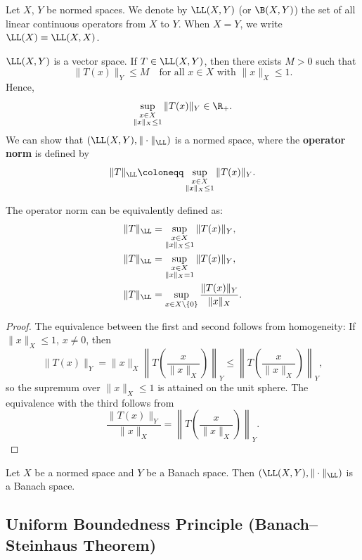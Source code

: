 \begin{definition}
Let $X$, $Y$ be normed spaces.  
We denote by $\LL(X,Y)$ (or $\B(X,Y)$) the set of all linear continuous operators from $X$ to $Y$.  
When $X = Y$, we write $\LL(X) \equiv \LL(X,X)$.
\end{definition}

\begin{remark}
$\LL(X,Y)$ is a vector space.  
If $T \in \LL(X,Y)$, then there exists $M > 0$ such that  
\[
\|T(x)\|_Y \leq M \quad \text{for all } x \in X \text{ with } \|x\|_X \leq 1.
\]
Hence,  
\[
\sup_{\substack{x \in X \\ \|x\|_X \leq 1}} \|T(x)\|_Y \in \R_+.
\]
We can show that $(\LL(X,Y), \|\cdot\|_{\LL})$ is a normed space, where the \textbf{operator norm} is defined by  
\[
\|T\|_{\LL} \coloneqq \sup_{\substack{x \in X \\ \|x\|_X \leq 1}} \|T(x)\|_Y.
\]
\end{remark}

\begin{proposition}
The operator norm can be equivalently defined as:
\begin{align*}
\|T\|_{\LL} &= \sup_{\substack{x \in X \\ \|x\|_X \leq 1}} \|T(x)\|_Y, \\
\|T\|_{\LL} &= \sup_{\substack{x \in X \\ \|x\|_X = 1}} \|T(x)\|_Y, \\
\|T\|_{\LL} &= \sup_{x \in X \setminus \{0\}} \frac{\|T(x)\|_Y}{\|x\|_X}.
\end{align*}
\end{proposition}

\begin{proof}
The equivalence between the first and second follows from homogeneity:  
If $\|x\|_X \leq 1$, $x \neq 0$, then  
\[
\|T(x)\|_Y = \|x\|_X \left\| T\left( \frac{x}{\|x\|_X} \right) \right\|_Y \leq \left\| T\left( \frac{x}{\|x\|_X} \right) \right\|_Y,
\]
so the supremum over $\|x\|_X \leq 1$ is attained on the unit sphere.  
The equivalence with the third follows from  
\[
\frac{\|T(x)\|_Y}{\|x\|_X} = \left\| T\left( \frac{x}{\|x\|_X} \right) \right\|_Y.
\]
\end{proof}

\begin{theorem}
Let $X$ be a normed space and $Y$ be a Banach space.  
Then $(\LL(X,Y), \|\cdot\|_{\LL})$ is a Banach space.
\end{theorem}

\subsection{Uniform Boundedness Principle (Banach–Steinhaus Theorem)}

